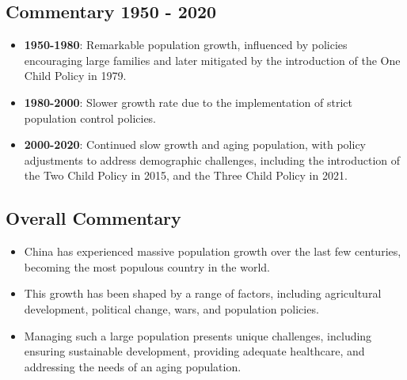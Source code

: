 \subsection*{Commentary 1950 - 2020}
\begin{itemize}
    \item \textbf{1950-1980}: Remarkable population growth, influenced by policies encouraging large families and later mitigated by the introduction of the One Child Policy in 1979.
    \item \textbf{1980-2000}: Slower growth rate due to the implementation of strict population control policies.
    \item \textbf{2000-2020}: Continued slow growth and aging population, with policy adjustments to address demographic challenges, including the introduction of the Two Child Policy in 2015, and the Three Child Policy in 2021.
\end{itemize}

\subsection*{Overall Commentary}
\begin{itemize}
    \item China has experienced massive population growth over the last few centuries, becoming the most populous country in the world.
    \item This growth has been shaped by a range of factors, including agricultural development, political change, wars, and population policies.
    \item Managing such a large population presents unique challenges, including ensuring sustainable development, providing adequate healthcare, and addressing the needs of an aging population.
\end{itemize}
